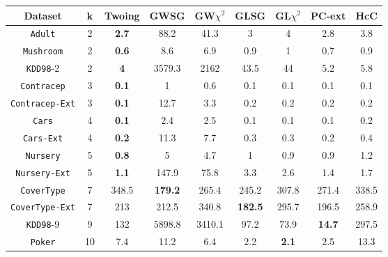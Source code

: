 \begin{table*}[]
\small
\centering
\begin{tabular}{c|c|c|c|c|c|c|c|c}
Dataset             & k  & Twoing     & GWSG       & GW$\chi^2$  & GLSG      & GL$\chi^2$ & PC-ext     & HcC        \\ \hline
{\tt Adult}         & 2  & {\bf 2.7}  & 88.2       & 41.3        & 3         & 4          & 2.8        & 3.8        \\
{\tt Mushroom}      & 2  & {\bf 0.6}  & 8.6        & 6.9         & 0.9       & 1          & 0.7        & 0.9        \\
{\tt KDD98}-2       & 2  & {\bf 4}    & 3579.3     & 2162        & 43.5      & 44         & 5.2        & 5.8        \\
{\tt Contracep}     & 3  & {\bf 0.1}  & 1          & 0.6         & 0.1       & 0.1        & 0.1        & 0.1        \\
{\tt Contracep-Ext} & 3  & {\bf 0.1}  & 12.7       & 3.3         & 0.2       & 0.2        & 0.2        & 0.2        \\
{\tt Cars}          & 4  & {\bf 0.1}  & 2.4        & 2.5         & 0.1       & 0.1        & 0.1        & 0.2        \\
{\tt Cars-Ext}      & 4  & {\bf 0.2}  & 11.3       & 7.7         & 0.3       & 0.3        & 0.2        & 0.4        \\
{\tt Nursery}       & 5  & {\bf 0.8}  & 5          & 4.7         & 1         & 0.9        & 0.9        & 1.2        \\
{\tt Nursery-Ext}   & 5  & {\bf 1.1}  & 147.9      & 75.8        & 3.3       & 2.6        & 1.4        & 1.7        \\
{\tt CoverType}     & 7  & 348.5      & {\bf 179.2}&  265.4      & 245.2     & 307.8      & 271.4      & 338.5      \\
{\tt CoverType-Ext} & 7  & 213        & 212.5      & 340.8       &{\bf 182.5}& 295.7      & 196.5      & 258.9      \\
{\tt KDD98}-9       & 9  & 132        & 5898.8     & 3410.1      & 97.2      & 73.9       & {\bf 14.7 }& 297.5      \\ 
{\tt Poker}         & 10 & 7.4        & 11.2       & 6.4         & 2.2       & {\bf 2.1}  & 2.5        & 13.3       \\

\end{tabular}
\end{table*}
